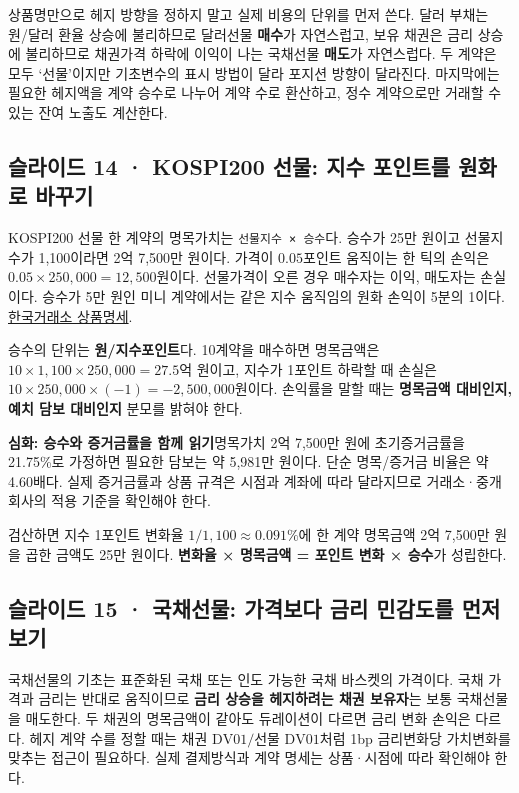 \documentclass[11pt,a4paper]{article}
\begin{document}
상품명만으로 헤지 방향을 정하지 말고 실제 비용의 단위를 먼저 쓴다. 달러 부채는 원/달러 환율 상승에 불리하므로 달러선물 \textbf{매수}가 자연스럽고, 보유 채권은 금리 상승에 불리하므로 채권가격 하락에 이익이 나는 국채선물 \textbf{매도}가 자연스럽다. 두 계약은 모두 ‘선물’이지만 기초변수의 표시 방법이 달라 포지션 방향이 달라진다. 마지막에는 필요한 헤지액을 계약 승수로 나누어 계약 수로 환산하고, 정수 계약으로만 거래할 수 있는 잔여 노출도 계산한다.\par

\subsection{슬라이드 14 · KOSPI200 선물: 지수 포인트를 원화로 바꾸기}
KOSPI200 선물 한 계약의 명목가치는 \texttt{선물지수 × 승수}다. 승수가 25만 원이고 선물지수가 1,100이라면 2억 7,500만 원이다. 가격이 $0.05$포인트 움직이는 한 틱의 손익은 $0.05\times250,000=12,500$원이다. 선물가격이 오른 경우 매수자는 이익, 매도자는 손실이다. 승수가 5만 원인 미니 계약에서는 같은 지수 움직임의 원화 손익이 5분의 1이다. \href{https://global.krx.co.kr/contents/GLB/02/0201/0201040201/GLB0201040201.jsp}{한국거래소 상품명세}.\par

승수의 단위는 \textbf{원/지수포인트}다. 10계약을 매수하면 명목금액은 $10\times1{,}100\times250{,}000=27.5$억 원이고, 지수가 1포인트 하락할 때 손실은 $10\times250{,}000\times(-1)=-2{,}500{,}000$원이다. 손익률을 말할 때는 \textbf{명목금액 대비인지, 예치 담보 대비인지} 분모를 밝혀야 한다.\par

\par\medskip\noindent\textbf{심화: 승수와 증거금률을 함께 읽기}\quad 명목가치 2억 7,500만 원에 초기증거금률을 21.75\%로 가정하면 필요한 담보는 약 5,981만 원이다. 단순 명목/증거금 비율은 약 4.60배다. 실제 증거금률과 상품 규격은 시점과 계좌에 따라 달라지므로 거래소·중개회사의 적용 기준을 확인해야 한다.\par

검산하면 지수 1포인트 변화율 $1/1{,}100\approx0.091\%$에 한 계약 명목금액 2억 7,500만 원을 곱한 금액도 25만 원이다. \textbf{변화율 × 명목금액 = 포인트 변화 × 승수}가 성립한다.\par

\subsection{슬라이드 15 · 국채선물: 가격보다 금리 민감도를 먼저 보기}
국채선물의 기초는 표준화된 국채 또는 인도 가능한 국채 바스켓의 가격이다. 국채 가격과 금리는 반대로 움직이므로 \textbf{금리 상승을 헤지하려는 채권 보유자}는 보통 국채선물을 매도한다. 두 채권의 명목금액이 같아도 듀레이션이 다르면 금리 변화 손익은 다르다. 헤지 계약 수를 정할 때는 $\text{채권 DV01}/\text{선물 DV01}$처럼 1bp 금리변화당 가치변화를 맞추는 접근이 필요하다. 실제 결제방식과 계약 명세는 상품·시점에 따라 확인해야 한다.\par
\end{document}
